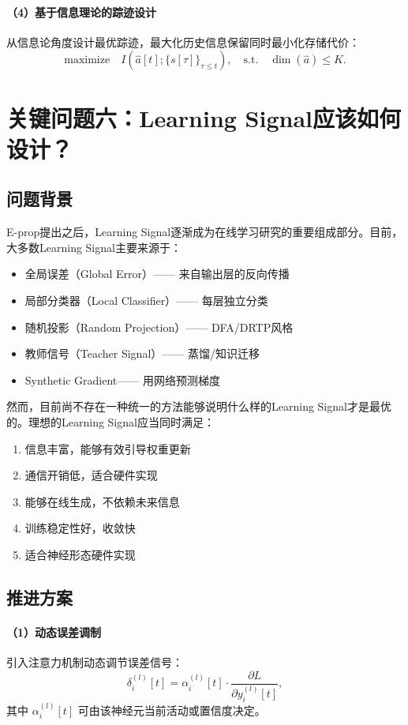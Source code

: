 \documentclass[journal,12pt,onecolumn]{IEEEtran}
\begin{document}
\paragraph{（4）基于信息理论的踪迹设计}
从信息论角度设计最优踪迹，最大化历史信息保留同时最小化存储代价：
\[
\text{maximize} \quad I(\hat{a}[t]; \{s[\tau]\}_{\tau \le t}), \quad \text{s.t.} \quad \dim(\hat{a}) \le K.
\]

\section{关键问题六：Learning Signal应该如何设计？}

\subsection{问题背景}

E-prop提出之后，Learning Signal逐渐成为在线学习研究的重要组成部分。目前，大多数Learning Signal主要来源于：

\begin{itemize}
    \item 全局误差（Global Error）—— 来自输出层的反向传播
    \item 局部分类器（Local Classifier）—— 每层独立分类
    \item 随机投影（Random Projection）—— DFA/DRTP风格
    \item 教师信号（Teacher Signal）—— 蒸馏/知识迁移
    \item Synthetic Gradient—— 用网络预测梯度
\end{itemize}

然而，目前尚不存在一种统一的方法能够说明什么样的Learning Signal才是最优的。理想的Learning Signal应当同时满足：
\begin{enumerate}
    \item 信息丰富，能够有效引导权重更新
    \item 通信开销低，适合硬件实现
    \item 能够在线生成，不依赖未来信息
    \item 训练稳定性好，收敛快
    \item 适合神经形态硬件实现
\end{enumerate}

\subsection{推进方案}

\paragraph{（1）动态误差调制}
引入注意力机制动态调节误差信号：
\[
\delta_i^{(l)}[t] = \alpha_i^{(l)}[t] \cdot \frac{\partial L}{\partial y_i^{(l)}[t]},
\]
其中 \(\alpha_i^{(l)}[t]\) 可由该神经元当前活动或置信度决定。
\end{document}
